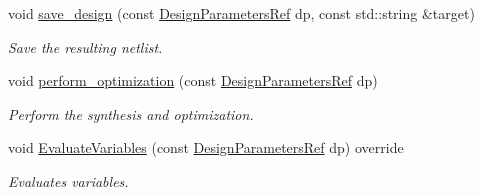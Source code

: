 \begin{DoxyCompactItemize}
void \hyperlink{classDesignCompilerWrapper_aa16222c84633b1ad3acfa380c4b68a9b}{save\+\_\+design} (const \hyperlink{DesignParameters_8hpp_ae36bb1c4c9150d0eeecfe1f96f42d157}{Design\+Parameters\+Ref} dp, const std\+::string \&target)
\begin{DoxyCompactList}\small\item\em Save the resulting netlist. \end{DoxyCompactList}\item 
void \hyperlink{classDesignCompilerWrapper_ab90629feb4fe9a74bb57606610561724}{perform\+\_\+optimization} (const \hyperlink{DesignParameters_8hpp_ae36bb1c4c9150d0eeecfe1f96f42d157}{Design\+Parameters\+Ref} dp)
\begin{DoxyCompactList}\small\item\em Perform the synthesis and optimization. \end{DoxyCompactList}\item 
void \hyperlink{classDesignCompilerWrapper_aab1d39b4695cbed4825c1154118e1bef}{Evaluate\+Variables} (const \hyperlink{DesignParameters_8hpp_ae36bb1c4c9150d0eeecfe1f96f42d157}{Design\+Parameters\+Ref} dp) override
\begin{DoxyCompactList}\small\item\em Evaluates variables. \end{DoxyCompactList}\end{DoxyCompactItemize}
